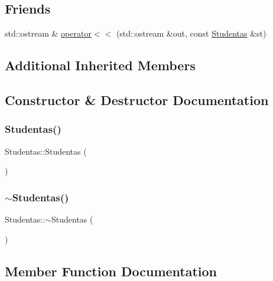 \subsection*{Friends}
\begin{DoxyCompactItemize}
\item 
std\+::ostream \& \mbox{\hyperlink{class_studentas_a75d9031fba1d66664f5ed4bb208a8e2c}{operator$<$$<$}} (std\+::ostream \&out, const \mbox{\hyperlink{class_studentas}{Studentas}} \&st)
\end{DoxyCompactItemize}
\subsection*{Additional Inherited Members}


\subsection{Constructor \& Destructor Documentation}
\mbox{\label{class_studentas_ab459e995e8c9b24cdc9aec5b09a66539}} 
\subsubsection{\texorpdfstring{Studentas()}{Studentas()}}
{\footnotesize\ttfamily Studentas\+::\+Studentas (\begin{DoxyParamCaption}{ }\end{DoxyParamCaption})}

\mbox{\label{class_studentas_a63e449e0f51a0b14340d02ee71b4be23}} 
\subsubsection{\texorpdfstring{$\sim$Studentas()}{~Studentas()}}
{\footnotesize\ttfamily Studentas\+::$\sim$\+Studentas (\begin{DoxyParamCaption}{ }\end{DoxyParamCaption})\hspace{0.3cm}{\ttfamily [inline]}}



\subsection{Member Function Documentation}
\mbox{\label{class_studentas_a2f9dcb2fef2e6b3dbc1581779a90a68a}} 
